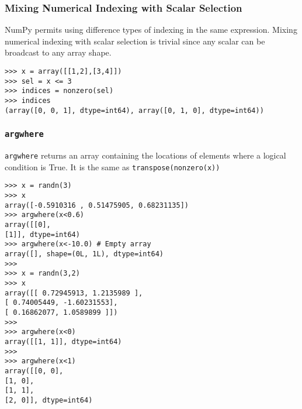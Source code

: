 \documentclass[KSmain.tex]{subfiles}
\begin{document}
\subsubsection*{Mixing Numerical Indexing with Scalar Selection}
NumPy permits using difference types of indexing in the same expression. Mixing numerical indexing
with scalar selection is trivial since any scalar can be broadcast to any array shape.


\begin{framed}
\begin{verbatim}
>>> x = array([[1,2],[3,4]])
>>> sel = x <= 3
>>> indices = nonzero(sel)
>>> indices
(array([0, 0, 1], dtype=int64), array([0, 1, 0], dtype=int64))
\end{verbatim}
\end{framed}

\subsubsection*{\texttt{argwhere}}
\texttt{argwhere} returns an array containing the locations of elements where a logical condition is True. It is the
same as \texttt{transpose(nonzero(x))}

\begin{framed}
\begin{verbatim}
>>> x = randn(3)
>>> x
array([-0.5910316 , 0.51475905, 0.68231135])
>>> argwhere(x<0.6)
array([[0],
[1]], dtype=int64)
>>> argwhere(x<-10.0) # Empty array
array([], shape=(0L, 1L), dtype=int64)
>>>
>>> x = randn(3,2)
>>> x
array([[ 0.72945913, 1.2135989 ],
[ 0.74005449, -1.60231553],
[ 0.16862077, 1.0589899 ]])
>>>
>>> argwhere(x<0)
array([[1, 1]], dtype=int64)
>>>
>>> argwhere(x<1)
array([[0, 0],
[1, 0],
[1, 1],
[2, 0]], dtype=int64)

\end{verbatim}
\end{framed}
\newpage
\end{document}

